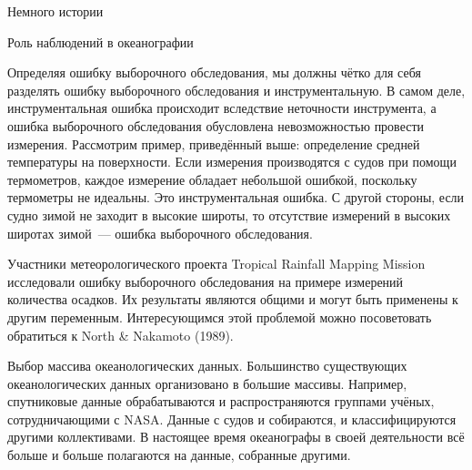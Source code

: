 \begin{chapter}{Немного истории}
\begin{section}{Роль наблюдений в океанографии}
{{Определяя ошибку выборочного обследования, мы должны чётко для себя разделять 
ошибку выборочного обследования и инструментальную. В самом деле,
инструментальная ошибка происходит вследствие неточности инструмента,
а ошибка выборочного обследования обусловлена невозможностью провести 
измерения. Рассмотрим пример, приведённый выше: определение средней температуры 
на поверхности. Если измерения производятся с судов при помощи термометров, 
каждое измерение обладает небольшой ошибкой, поскольку термометры не идеальны. 
Это инструментальная ошибка. С другой стороны, если судно зимой не заходит 
в высокие широты, то отсутствие  измерений в высоких широтах зимой~--- ошибка 
выборочного обследования.
%

Участники метеорологического проекта Tropical Rainfall Mapping Mission 
исследовали ошибку выборочного обследования на примере измерений количества осадков. 
Их результаты являются общими и могут быть применены к другим переменным. 
Интересующимся этой проблемой можно посоветовать обратиться к North \& Nakamoto (1989).
%
}%
}

\begin{paragraph}{Выбор массива океанологических данных.}
Большинство существующих
океанологических данных организовано в большие массивы.
Например, спутниковые данные обрабатываются и распространяются
группами учёных, сотрудничающими с NASA. Данные с судов и собираются, и
классифицируются другими коллективами. В настоящее время океанографы в своей 
деятельности всё больше и больше полагаются на данные, собранные другими.
%



\end{paragraph}
\end{section}
\end{chapter}
